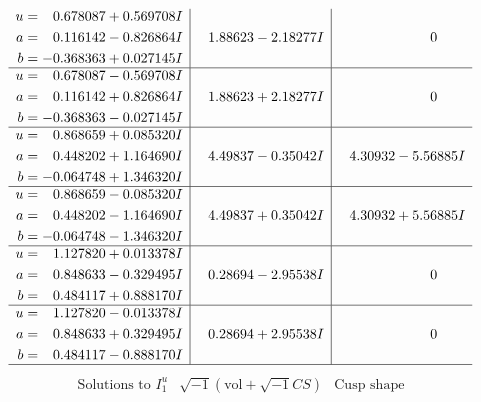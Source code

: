 \documentclass[1p]{elsarticle_modified}
\theoremstyle{definition}
\newcommand{\I}{\sqrt{-1}}
\begin{document}
$$\begin{array}{c|c|c}
\begin{aligned}
u &= \phantom{-}0.678087 + 0.569708 I \\
a &= \phantom{-}0.116142 - 0.826864 I \\
b &= -0.368363 + 0.027145 I\end{aligned}
 & \phantom{-}1.88623 - 2.18277 I & \phantom{-0.000000 } 0 \\ \hline\begin{aligned}
u &= \phantom{-}0.678087 - 0.569708 I \\
a &= \phantom{-}0.116142 + 0.826864 I \\
b &= -0.368363 - 0.027145 I\end{aligned}
 & \phantom{-}1.88623 + 2.18277 I & \phantom{-0.000000 } 0 \\ \hline\begin{aligned}
u &= \phantom{-}0.868659 + 0.085320 I \\
a &= \phantom{-}0.448202 + 1.164690 I \\
b &= -0.064748 + 1.346320 I\end{aligned}
 & \phantom{-}4.49837 - 0.35042 I & \phantom{-}4.30932 - 5.56885 I \\ \hline\begin{aligned}
u &= \phantom{-}0.868659 - 0.085320 I \\
a &= \phantom{-}0.448202 - 1.164690 I \\
b &= -0.064748 - 1.346320 I\end{aligned}
 & \phantom{-}4.49837 + 0.35042 I & \phantom{-}4.30932 + 5.56885 I \\ \hline\begin{aligned}
u &= \phantom{-}1.127820 + 0.013378 I \\
a &= \phantom{-}0.848633 - 0.329495 I \\
b &= \phantom{-}0.484117 + 0.888170 I\end{aligned}
 & \phantom{-}0.28694 - 2.95538 I & \phantom{-0.000000 } 0 \\ \hline\begin{aligned}
u &= \phantom{-}1.127820 - 0.013378 I \\
a &= \phantom{-}0.848633 + 0.329495 I \\
b &= \phantom{-}0.484117 - 0.888170 I\end{aligned}
 & \phantom{-}0.28694 + 2.95538 I & \phantom{-0.000000 } 0\\
 \hline 
 \end{array}$$\newpage$$\begin{array}{c|c|c}  
\text{Solutions to }I^u_{1}& \I (\text{vol} + \sqrt{-1}CS) & \text{Cusp shape}\\

\end{array}$$
\end{document}
